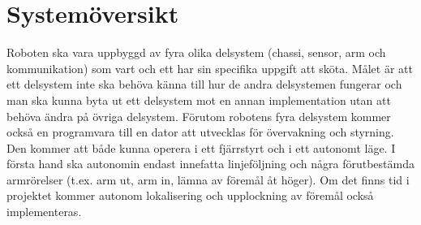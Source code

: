\documentclass[a4paper,12pt]{article}
\renewcommand{\thepage}{\roman{page}}
\begin{document}
\LIPStitelsida

\begin{LIPSprojektidentitet}
\end{LIPSprojektidentitet}


\renewcommand*\contentsname{Innehåll}
\begin{spacing}{0.5}
\tableofcontents{}
\end{spacing}
\newpage

\begin{LIPSdokumenthistorik}
\end{LIPSdokumenthistorik}
\newpage

\renewcommand{\thepage}{\arabic{page}}
\setcounter{page}{1}

\section{Systemöversikt}

Roboten ska vara uppbyggd av fyra olika delsystem (chassi, sensor, arm och kommunikation) som vart och ett har sin specifika uppgift att sköta. Målet är att ett delsystem inte ska behöva känna till hur de andra delsystemen fungerar och man ska kunna byta ut ett delsystem mot en annan implementation utan att behöva ändra på övriga delsystem. Förutom robotens fyra delsystem kommer också en programvara till en dator att utvecklas för övervakning och styrning. Den kommer att både kunna operera i ett fjärrstyrt och i ett autonomt läge. I första hand ska autonomin endast innefatta linjeföljning och några förutbestämda armrörelser (t.ex. arm ut, arm in, lämna av föremål åt höger). Om det finns tid i projektet kommer autonom lokalisering och upplockning av föremål också implementeras.
\end{document}
